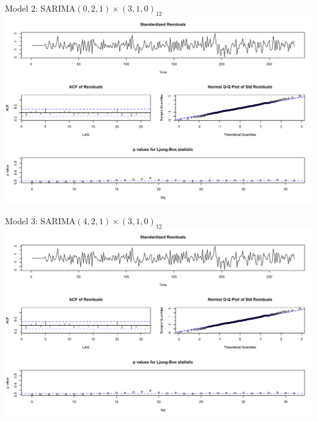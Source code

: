 {     %
     
     \begin{frame}{Model 2: SARIMA\((0,2,1) \times (3,1,0)_{12}\)}
     	\includegraphics[width=\linewidth]{images/seasonalmodel2}
     \end{frame}  
     
     
     \begin{frame}{Model 3: SARIMA\((4, 2, 1) \times (3,1,0)_{12}\)}
     	\includegraphics[width=\linewidth]{images/seasonalmodel3}
     \end{frame}  
     
}
